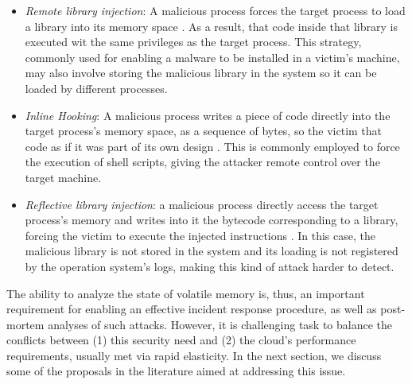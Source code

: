 \documentclass[conference]{IEEEtran}
\newcommand{\marcos}[1]{{\color{green}{MARCOS: #1}}}
\begin{document}
\begin{itemize}
 \item \textit{Remote library injection}: A malicious process forces the target process to load a library into its memory space \cite{Miller_Remote_Library_Injection:2004}.
 As a result, that code inside that library is executed wit the same privileges as the target process. 
 This strategy, commonly used for enabling a malware to be installed in a victim's machine, may also involve storing the malicious library in the system so it can be loaded by different processes.
 

 \item \textit{Inline Hooking}: A malicious process writes a piece of code directly into the target process's memory space, as a sequence of bytes, so the victim that code as if it was part of its own design \cite{inline-hooking:2008}.
%
This is commonly employed to force the execution of shell scripts, giving the attacker remote control over the target machine.


 \item \textit{Reflective library injection}: a malicious process directly access the target process's memory and writes into it the bytecode corresponding to a library, forcing the victim to execute the injected instructions \cite{reflective-lib-injection:2008}.
 In this case, the malicious library is not stored in the system and its loading is not registered by the operation system's logs, making this kind of attack harder to detect.
\end{itemize}	



The ability to analyze the state of volatile memory is, thus, an important requirement for enabling an effective incident response procedure, as well as post-mortem analyses of such attacks.
%
However, it is challenging task to balance the conflicts between (1) this security need and (2) the cloud's performance requirements, usually met via rapid elasticity. 
%
In the next section, we discuss some of the proposals in the literature aimed at addressing this issue.



%
\end{document}
